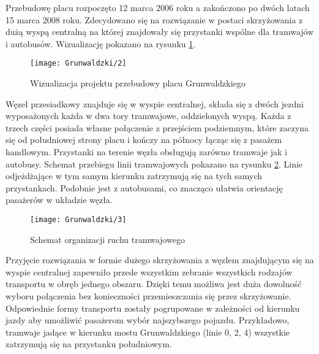 \documentclass[twoside,12pt]{article}
\begin{document}
	Przebudowę placu rozpoczęto 12 marca 2006 roku a zakończono po dwóch latach 15 marca 2008 roku. Zdecydowano się na rozwiązanie w postaci skrzyżowania z dużą wyspą centralną na której znajdowały się przystanki wspólne dla tramwajów i autobusów. Wizualizację pokazano na rysunku \ref{grunwaldzki2}. 
	
	\begin{figure}[H]
		\centering
		\texttt{[image: Grunwaldzki/2]}\\
		\caption{Wizualizacja projektu przebudowy placu Grunwaldzkiego}
		\label{grunwaldzki2}
	\end{figure}	
	
	Węzeł przesiadkowy znajduje się w wyspie centralnej, składa się z dwóch jezdni wyposażonych każda w dwa tory tramwajowe, oddzielonych wyspą. Każda z trzech części posiada własne połączenie z przejściem podziemnym, które zaczyna się od południowej strony placu i kończy na północy łącząc się z pasażem handlowym. Przystanki na terenie węzła obsługują zarówno tramwaje jak i autobusy. Schemat przebiegu linii tramwajowych pokazano na rysunku \ref{grunwaldzki3}. Linie odjeżdżające w tym samym kierunku zatrzymują się na tych samych przystankach. Podobnie jest z autobusami, co znacząco ułatwia orientację pasażerów w układzie węzła. 
	
	\begin{figure}[H]
		\centering
		\texttt{[image: Grunwaldzki/3]}\\
		\caption{Schemat organizacji ruchu tramwajowego}
		\label{grunwaldzki3}
	\end{figure}	
	
	Przyjęcie rozwiązania w formie dużego skrzyżowania z węzłem znajdującym się na wyspie centralnej zapewniło przede wszystkim zebranie wszystkich rodzajów transportu w obręb jednego obszaru. Dzięki temu możliwa jest duża dowolność wyboru połączenia bez konieczności przemieszczania się przez skrzyżowanie. Odpowiednie formy transportu zostały pogrupowane w zależności od kierunku jazdy aby umożliwić pasażerom wybór najszybszego pojazdu. Przykładowo, tramwaje jadące w kierunku mostu Grunwaldzkiego (linie 0, 2, 4) wszystkie zatrzymują się na przystanku południowym. 
	
\end{document}
